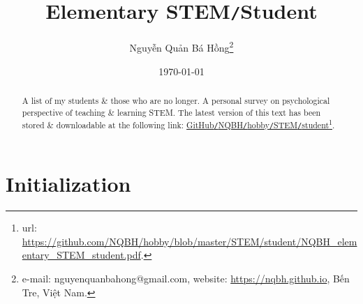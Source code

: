 \documentclass{article}
\title{Elementary STEM{\tt/}Student}
\author{Nguyễn Quản Bá Hồng\footnote{e-mail: {\sf nguyenquanbahong@gmail.com}, website: \url{https://nqbh.github.io}, Bến Tre, Việt Nam.}}
\date{\today}
\begin{document}
\maketitle
\begin{abstract}
	A list of my students \& those who are no longer. A personal survey on psychological perspective of teaching \& learning STEM. The latest version of this text has been stored \& downloadable at the following link: \href{https://github.com/NQBH/hobby/blob/master/STEM/student/NQBH_elementary_STEM_student.pdf}{GitHub\texttt{/}NQBH\texttt{/}hobby\texttt{/}STEM\texttt{/}student}\footnote{{\sc url}: \url{https://github.com/NQBH/hobby/blob/master/STEM/student/NQBH_elementary_STEM_student.pdf}.}.
\end{abstract}
\tableofcontents


\section*{Initialization}
\end{document}
